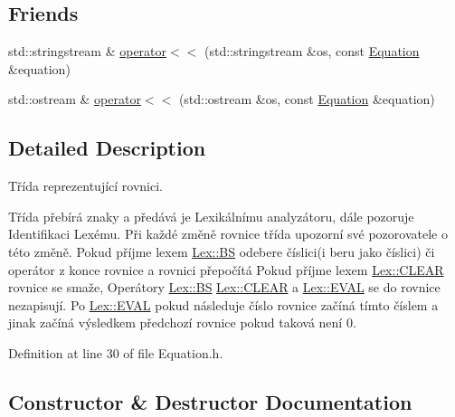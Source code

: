 \subsection*{Friends}
\begin{DoxyCompactItemize}
\item 
std\+::stringstream \& \hyperlink{classteam22_1_1_calc_1_1_equation_a8ee0e20eaa10e114d79e0b16cb11ddcf}{operator$<$$<$} (std\+::stringstream \&os, const \hyperlink{classteam22_1_1_calc_1_1_equation}{Equation} \&equation)
\item 
std\+::ostream \& \hyperlink{classteam22_1_1_calc_1_1_equation_aea7df9bdea5430cc309e17f1f2fbe78f}{operator$<$$<$} (std\+::ostream \&os, const \hyperlink{classteam22_1_1_calc_1_1_equation}{Equation} \&equation)
\end{DoxyCompactItemize}


\subsection{Detailed Description}
Třída reprezentující rovnici. 

Třída přebírá znaky a předává je Lexikálnímu analyzátoru, dále pozoruje Identifikaci Lexému. Při každé změně rovnice třída upozorní své pozorovatele o této změně. Pokud příjme lexem \hyperlink{classteam22_1_1_calc_1_1_lex_a61d29fc4878a3b36d2de2f13c56ed932ac62fe9cff8a15f20fb1416612309ae80}{Lex\+::\+BS} odebere číslici(i beru jako číslici) či operátor z konce rovnice a rovnici přepočítá Pokud příjme lexem \hyperlink{classteam22_1_1_calc_1_1_lex_a61d29fc4878a3b36d2de2f13c56ed932a4281d7ef6ac8dbf79c87603ca20c351c}{Lex\+::\+C\+L\+E\+AR} rovnice se smaže, Operátory \hyperlink{classteam22_1_1_calc_1_1_lex_a61d29fc4878a3b36d2de2f13c56ed932ac62fe9cff8a15f20fb1416612309ae80}{Lex\+::\+BS} \hyperlink{classteam22_1_1_calc_1_1_lex_a61d29fc4878a3b36d2de2f13c56ed932a4281d7ef6ac8dbf79c87603ca20c351c}{Lex\+::\+C\+L\+E\+AR} a \hyperlink{classteam22_1_1_calc_1_1_lex_a61d29fc4878a3b36d2de2f13c56ed932a3c1443c79523cadf6582f238c04a015f}{Lex\+::\+E\+V\+AL} se do rovnice nezapisují. Po \hyperlink{classteam22_1_1_calc_1_1_lex_a61d29fc4878a3b36d2de2f13c56ed932a3c1443c79523cadf6582f238c04a015f}{Lex\+::\+E\+V\+AL} pokud následuje číslo rovnice začíná tímto číslem a jinak začíná výsledkem předchozí rovnice pokud taková není 0. 

Definition at line 30 of file Equation.\+h.



\subsection{Constructor \& Destructor Documentation}
\mbox{\label{classteam22_1_1_calc_1_1_equation_a085dc8be6e009511735b8c317d951610}} 
